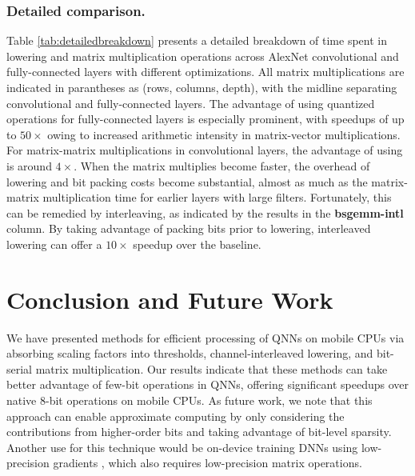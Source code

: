 \documentclass[sigconf]{acmart}
\begin{document}
\subsubsection{Detailed comparison.}
Table \ref{tab:detailedbreakdown} presents a detailed breakdown of time spent in lowering and matrix multiplication operations across AlexNet convolutional and fully-connected layers with different optimizations.
All matrix multiplications are indicated in parantheses as (rows, columns, depth), with the midline separating convolutional and fully-connected layers.
The advantage of using quantized operations for fully-connected layers is especially prominent, with speedups of up to $50\times$ owing to increased arithmetic intensity in matrix-vector multiplications.
For matrix-matrix multiplications in convolutional layers, the advantage of using  \ours{} is around $4\times$.
When the matrix multiplies become faster, the overhead of lowering and bit packing costs become substantial, almost as much as the matrix-matrix multiplication time for earlier layers with large filters.
Fortunately, this can be remedied by interleaving, as indicated by the results in the \textbf{bsgemm-intl} column.
By taking advantage of packing bits prior to lowering, interleaved lowering can offer a $10\times$ speedup over the baseline.


\section{Conclusion and Future Work}
We have presented methods for efficient processing of QNNs on mobile CPUs via absorbing scaling factors into thresholds, channel-interleaved lowering, and bit-serial matrix multiplication.
Our results indicate that these methods can take better advantage of few-bit operations in QNNs, offering significant speedups over native 8-bit operations on mobile CPUs. As future work, we note that this approach can enable approximate computing by only considering the contributions from higher-order bits and taking advantage of bit-level sparsity.
Another use for this technique would be on-device training DNNs using low-precision gradients \cite{lowprecsgd}, which also requires low-precision matrix operations.


 
\end{document}
